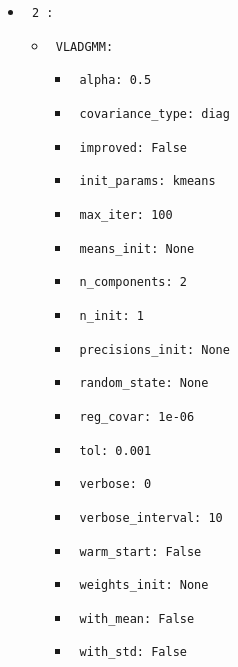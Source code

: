\documentclass[11pt]{article}
\begin{document}
\begin{itemize}
\begin{itemize}
           \end{itemize}
    \item
     \verb| 2 :|
     \begin{itemize}
             \item
            \verb| VLADGMM: |

                   \begin{itemize}
                                    \item
                        \verb| alpha: 0.5 |
                                    \item
                        \verb| covariance_type: diag |
                                    \item
                        \verb| improved: False |
                                    \item
                        \verb| init_params: kmeans |
                                    \item
                        \verb| max_iter: 100 |
                                    \item
                        \verb| means_init: None |
                                    \item
                        \verb| n_components: 2 |
                                    \item
                        \verb| n_init: 1 |
                                    \item
                        \verb| precisions_init: None |
                                    \item
                        \verb| random_state: None |
                                    \item
                        \verb| reg_covar: 1e-06 |
                                    \item
                        \verb| tol: 0.001 |
                                    \item
                        \verb| verbose: 0 |
                                    \item
                        \verb| verbose_interval: 10 |
                                    \item
                        \verb| warm_start: False |
                                    \item
                        \verb| weights_init: None |
                                    \item
                        \verb| with_mean: False |
                                    \item
                        \verb| with_std: False |
                            \end{itemize}
       

\end{itemize}
\end{itemize}
\end{document}
